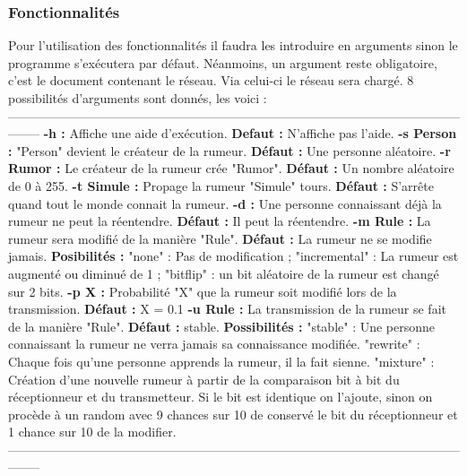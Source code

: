 \documentclass[a4paper,11pt]{article}
\begin{document}
\subsubsection{Fonctionnalités}
{Pour l'utilisation des fonctionnalités il faudra les introduire en arguments sinon le programme s'exécutera par défaut.
Néanmoins, un argument reste obligatoire, c'est le document contenant le réseau. Via celui-ci le réseau sera chargé.
8 possibilités d'arguments sont donnés, les voici :\newline
--------------------------------------------------------------------------------------------------------------------
\newline\textbf{-h :} Affiche une aide d'exécution. \textbf{Defaut :} N'affiche pas l'aide.
\newline\textbf{-s Person :} "Person" devient le créateur de la rumeur. \textbf{Défaut :} Une personne aléatoire.
\newline\textbf{-r Rumor :} Le créateur de la rumeur crée "Rumor". \textbf{Défaut :} Un nombre aléatoire de 0 à 255.
\newline\textbf{-t Simule :} Propage la rumeur "Simule" tours. \textbf{Défaut :} S'arrête quand tout le monde connait la rumeur.
\newline\textbf{-d :} Une personne connaissant déjà la rumeur ne peut la réentendre. \textbf{Défaut :} Il peut la réentendre.
\newline\textbf{-m Rule :} La rumeur sera modifié de la manière "Rule". \textbf{Défaut :} La rumeur ne se modifie jamais.
\textbf{Posibilités :} "none" : Pas de modification ; "incremental" : La rumeur est augmenté ou diminué de 1 ;
"bitflip" : un bit aléatoire de la rumeur est changé sur 2 bits.
\newline\textbf{-p X :} Probabilité "X" que la rumeur soit modifié lors de la transmission. \textbf{Défaut :} X = 0.1
\newline\textbf{-u Rule :} La transmission de la rumeur se fait de la manière "Rule". \textbf{Défaut :} stable.
\newline\textbf{Possibilités :} "stable" : Une personne connaissant la rumeur ne verra jamais sa connaissance modifiée.
"rewrite" : Chaque fois qu'une personne apprends la rumeur, il la fait sienne. \newline"mixture" : Création d'une nouvelle rumeur à partir 
de la comparaison bit à bit du réceptionneur et du transmetteur. Si le bit est identique on l'ajoute, sinon on procède à un random 
avec 9 chances sur 10 de conservé le bit du réceptionneur et 1 chance sur 10 de la modifier.
\newline--------------------------------------------------------------------------------------------------------------------}
\end{document}
